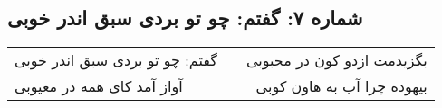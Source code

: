 \begin{center}
\section*{شماره ۷: گفتم: چو تو بردی سبق اندر خوبی}
\label{sec:007}
\begin{longtable}{l p{0.5cm} r}
گفتم: چو تو بردی سبق اندر خوبی
&&
بگزیدمت ازدو کون در محبوبی
\\
آواز آمد کای همه در معیوبی
&&
بیهوده چرا آب به هاون کوبی
\\
\end{longtable}
\end{center}
